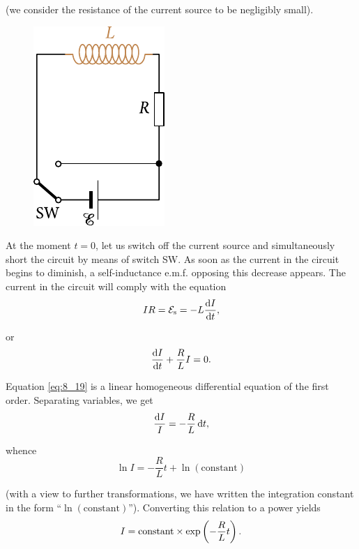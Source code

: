 \noindent
(we consider the resistance of the current source to
be negligibly small).

\begin{figure}[t]
	\begin{center}
		\includegraphics[scale=1]{figures/ch_08/fig_8_7.pdf}
		\caption[]{}
		\label{fig:8_7}
	\end{center}
	\vspace{-0.8cm}
\end{figure}

At the moment $t=0$, let us switch off the current source and simultaneously short the circuit by means of switch SW.
As soon as the current in the circuit begins to diminish, a self-inductance e.m.f. opposing this decrease appears.
The current in the circuit will comply with the equation
\begin{equation*}
	IR = \mathcal{E}_{\text{s}} = - L \dfrac{\mathrm{d} I}{\mathrm{d} t},
\end{equation*}

\noindent
or
\begin{equation}\label{eq:8_19}
	\dfrac{\mathrm{d} I}{\mathrm{d} t} + \frac{R}{L} I = 0.
\end{equation}

\noindent
Equation \eqref{eq:8_19} is a linear homogeneous differential equation of the first order.
Separating variables, we get
\begin{equation*}
	\frac{\mathrm{d} I}{I} = - \frac{R}{L}\, \mathrm{d} t,
\end{equation*}

\noindent
whence
\begin{equation*}
	\ln{I} = - \frac{R}{L} t + \ln(\text{constant})
\end{equation*}

\noindent
(with a view to further transformations, we have written the integration constant in the form ``$\ln(\text{constant})$'').
Converting this relation to a power yields
\begin{equation}\label{eq:8_20}
	I = \text{constant} \times \exp\left(- \frac{R}{L} t\right).
\end{equation}

